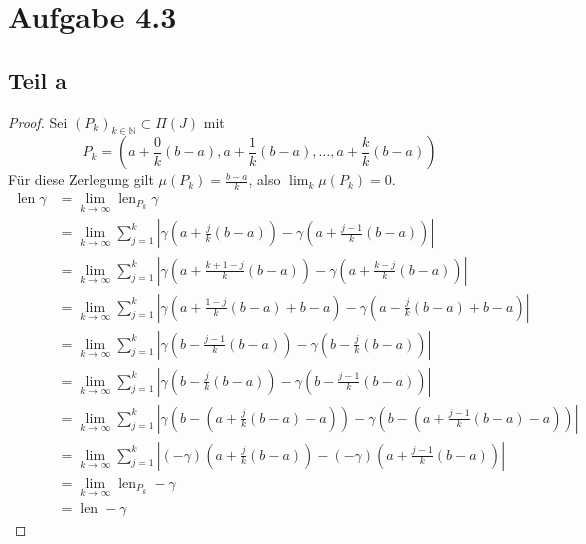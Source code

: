 \documentclass[10pt,a4paper]{article}
\DeclareMathOperator{\len}{len}
\begin{document}
\section{Aufgabe 4.3}

\subsection{Teil a}

\begin{proof}
  Sei $(P_{k})_{k \in \mathbb{N}} \subset \Pi(J)$ mit
  \begin{equation*}
    P_{k} = \left( a + \frac{0}{k}(b - a), a + \frac{1}{k}(b - a), \dots, a + \frac{k}{k} (b - a) \right)
  \end{equation*}
  Für diese Zerlegung gilt $\mu(P_{k}) = \frac{b - a}{k}$, also
  $\lim_{k} \mu(P_{k}) = 0$.
  \begin{align*}
    \len \gamma & = \lim_{k \to \infty} \len_{P_{k}} \gamma\\
                & = \lim_{k \to \infty} \sum_{j = 1}^{k} \left| \gamma\left( a + \frac{j}{k}(b - a) \right) - \gamma\left( a + \frac{j - 1}{k}(b - a) \right) \right|\\
                & = \lim_{k \to \infty} \sum_{j = 1}^{k} \left| \gamma\left( a + \frac{k + 1 - j}{k}(b - a) \right) - \gamma\left( a + \frac{k - j}{k}(b - a) \right) \right|\\
                & = \lim_{k \to \infty} \sum_{j = 1}^{k} \left| \gamma\left( a + \frac{1 - j}{k}(b - a) + b - a \right) - \gamma\left( a - \frac{j}{k}(b - a) + b - a \right) \right|\\
                & = \lim_{k \to \infty} \sum_{j = 1}^{k} \left| \gamma\left( b - \frac{j - 1}{k}(b - a) \right) - \gamma\left( b - \frac{j}{k}(b - a) \right) \right|\\
                & = \lim_{k \to \infty} \sum_{j = 1}^{k} \left| \gamma\left( b - \frac{j}{k}(b - a) \right) - \gamma\left( b - \frac{j - 1}{k}(b - a) \right) \right|\\
                & = \lim_{k \to \infty} \sum_{j = 1}^{k} \left| \gamma\left( b - (a + \frac{j}{k}(b - a) - a) \right) - \gamma\left( b - (a + \frac{j - 1}{k}(b - a) - a) \right) \right|\\
                & = \lim_{k \to \infty} \sum_{j = 1}^{k} \left| (-\gamma)\left( a + \frac{j}{k}(b - a) \right) - (-\gamma)\left( a + \frac{j - 1}{k}(b - a) \right) \right|\\
                & = \lim_{k \to \infty} \len_{P_{k}} -\gamma\\
                & = \len -\gamma
  \end{align*}
\end{proof}
\end{document}
